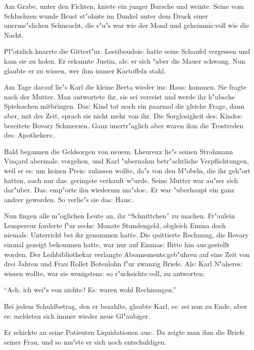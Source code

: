 \documentclass[oneside,12pt]{book}
\newcommand{\s}{s:}%
\begin{document}
Am Grabe, unter den Fichten, kniete ein junger Bursche und weinte.
Seine vom Schluchzen wunde Brust st"ohnte im Dunkel unter dem
Druck einer unerme"slichen Sehnsucht, die s"u"s war wie der Mond
und geheimni{\s}voll wie die Nacht.

Pl"otzlich knarrte die Gittert"ur. Lestiboudoi{\s} hatte seine
Schaufel vergessen und kam sie zu holen. Er erkannte Justin,
al{\s} er sich "uber die Mauer schwang. Nun glaubte er zu wissen,
wer ihm immer Kartoffeln stahl.


\newpage\begin{center}
{\large \so{Le{tz}te{\s} Kapitel}}\bigskip\bigskip
\end{center}

Am Tage darauf lie"s Karl die kleine Berta wieder in{\s} Hau{\s}
kommen. Sie fragte nach der Mutter. Man antwortete ihr, sie sei
verreist und werde ihr h"ubsche Spielsachen mitbringen. Da{\s}
Kind tat noch ein paarmal die gleiche Frage, dann aber, mit der
Zeit, sprach sie nicht mehr von ihr. Die Sorglosigkeit de{\s}
Kinde{\s} bereitete Bovary Schmerzen. Ganz unertr"aglich aber
waren ihm die Trostreden de{\s} Apotheker{\s}.

Bald begannen die Geldsorgen von neuem. Lheureux lie"s seinen
Strohmann Vin\c{c}ard abermal{\s} vorgehen, und Karl "ubernahm
betr"achtliche Verpflichtungen, weil er e{\s} um keinen Prei{\s}
zulassen wollte, da"s von den M"obeln, die ihr geh"ort hatten,
auch nur da{\s} geringste verkauft w"urde. Seine Mutter war au"ser
sich dar"uber. Da{\s} emp"orte ihn wiederum ma"slo{\s}. Er war
"uberhaupt ein ganz andrer geworden. So verlie"s sie da{\s}
Hau{\s}.

Nun fingen alle m"oglichen Leute an, ihr "`Schnittchen"' zu
machen. Fr"aulein Lempereur forderte f"ur sech{\s} Monate
Stundengeld, obgleich Emma doch niemal{\s} Unterricht bei ihr
genommen hatte. Die quittierte Rechnung, die Bovary einmal gezeigt
bekommen hatte, war nur auf Emma{\s} Bitte hin au{\s}gestellt
worden. Der Leihbibliothekar verlangte Abonnement{\s}geb"uhren auf
eine Zeit von drei Jahren und Frau Rollet Botenlohn f"ur zwanzig
Briefe. Al{\s} Karl N"ahere{\s} wissen wollte, war sie
wenigsten{\s} so r"ucksicht{\s}voll, zu antworten:

"`Ach, ich wei"s von nicht{\s}! E{\s} waren wohl Rechnungen."'

Bei jedem Schuldbetrag, den er bezahlte, glaubte Karl, e{\s} sei
nun zu Ende, aber e{\s} meldeten sich immer wieder neue
Gl"aubiger.

Er schickte an seine Patienten Liquidationen au{\s}. Da zeigte man
ihm die Briefe seiner Frau, und so mu"ste er sich noch
entschuldigen.
\end{document}
